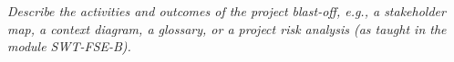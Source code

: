 \emph{Describe the activities and outcomes of the project blast-off, e.g., a 
stakeholder map, a context diagram, a glossary, or a project risk analysis (as 
taught in the  module SWT-FSE-B).}